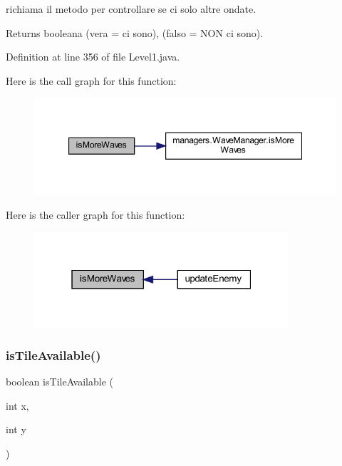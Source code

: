 richiama il metodo per controllare se ci solo altre ondate. 

\begin{DoxyReturn}{Returns}
booleana (vera = ci sono), (falso = N\+ON ci sono). 
\end{DoxyReturn}


Definition at line 356 of file Level1.\+java.

Here is the call graph for this function\+:\nopagebreak
\begin{figure}[H]
\begin{center}
\leavevmode
\includegraphics[width=347pt]{classscenes_1_1_level1_a999f12a033f49f299ad7f55bcae24447_cgraph}
\end{center}
\end{figure}
Here is the caller graph for this function\+:\nopagebreak
\begin{figure}[H]
\begin{center}
\leavevmode
\includegraphics[width=268pt]{classscenes_1_1_level1_a999f12a033f49f299ad7f55bcae24447_icgraph}
\end{center}
\end{figure}
\mbox{\label{classscenes_1_1_level1_aaeac2ee6b3a920a21928ee7b3dc8e7a9}} 
\subsubsection{\texorpdfstring{is\+Tile\+Available()}{isTileAvailable()}}
{\footnotesize\ttfamily boolean is\+Tile\+Available (\begin{DoxyParamCaption}\item[{int}]{x,  }\item[{int}]{y }\end{DoxyParamCaption})\hspace{0.3cm}{\ttfamily [private]}}



